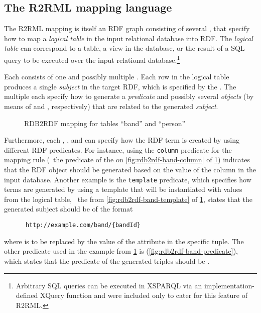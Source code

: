 \subsection{The R2RML mapping language}
\label{sec:r2rml-mapp-lang}

The R2RML mapping is itself an \ac{RDF} graph consisting of several , that specify how to map a
\emph{logical table} in the input relational database into \ac{RDF}.  The \emph{logical table} can correspond to a
table, a view in the database, or the result of a SQL query to be executed over the input relational
database.\footnote{Arbitrary SQL queries can be executed in XSPARQL via an implementation-defined XQuery function and
  were included only to cater for this feature of R2RML.}


Each  consists of one  and possibly multiple .  Each row in
the logical table produces a single \emph{subject} in the target \ac{RDF}, which is specified by the .
The multiple  each specify how to generate a \emph{predicate} and possibly several
\emph{objects} (by means of  and , respectively) that are related to the generated
\emph{subject}.

\begin{figure}[t]
  \centering
  
  \caption{RDB2RDF mapping for tables ``band'' and ``person''}
  \label{fig:rdb2rdf-band}
\end{figure}

Furthermore, each , , and  can specify how the \ac{RDF} term is created
by using different \ac{RDF} predicates.  For instance, using the \texttt{column} predicate for the mapping rule (\eg~the
predicate of the  on \cref{fig:rdb2rdf-band-column} of \cref{fig:rdb2rdf-band}) indicates that
the \ac{RDF} object should be generated based on the value of the column in the input database.
%
Another example is the \texttt{template} predicate, which specifies how terms are generated by using a template that
will be instantiated with values from the logical table, \eg~the  from \cref{fig:rdb2rdf-band-template}
of \cref{fig:rdb2rdf-band}, states that the generated subject should be of the format
%
\begin{verbatim}
      http://example.com/band/{bandId}
\end{verbatim}
%
where  is to be replaced by the value of the  attribute in the specific tuple.
%
The other predicate used in the example from \cref{fig:rdb2rdf-band} is 
(\cref{fig:rdb2rdf-band-predicate}), which states that the predicate of the generated triples should be
.

